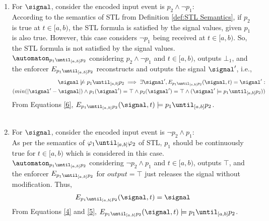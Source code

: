 \begin{enumerate}
\begin{enumerate}
                \item [Case b:] For $\signal$, consider the encoded input event is $p_2 \land \neg p_1$:\\
                
                According to the semantics of STL from Definition \ref{def:STL Semantics}, if  $p_2$ is true at  $t \in [a, b)$, the STL formula is satisfied by the signal values, given $p_1$ is also true. However, this case considers $\neg p_1$ being received at $t \in [a, b)$. So, the STL formula is not satisfied by the signal values.\\
                
                $\automaton_{p_1\until_{[a,b]}p_2}$ considering $p_2 \land \neg p_1$ and  $t \in [a,b) $, outputs $\bot_1$, and the enforcer $E_{p_1\until_{[a,b]}p_2}$ reconstructs and outputs the signal $\signal'$, i.e.,
            \begin{equation}    
            \begin{split}
            \label{6}
                \signal \not \models p_1\until_{[a,b]}p_2 \implies \exists\signal', E_{p_1\until_{[a,b]}p_2}(\signal, t)=\signal' : \\(min(|\signal'-\signal|) \land p_1(\signal')=\top \land p_2(\signal')=\top \land (\signal'\models p_1\until_{[a,b]}p_2))
            \end{split}
            \end{equation}  
            From Equations \ref{6},  $E_{p_1\until_{[a,b]}p_2}(\signal, t) \models p_1\until_{[a,b]}p_2$. \\~\\
            
                \item [Case c:] For $\signal$, consider the encoded input event is $\neg p_2 \land p_1$:\\
                    
                As per the semantics of $\varphi_1\until_{[a,b]}\varphi_2$ of STL, $p_1$ should be continuously true for $t \in [a,b) $ which is considered in this case.\\

                $\automaton_{p_1\until_{[a,b]}p_2}$ considering $\neg p_2 \land p_1$ and  $t \in [a,b) $, outputs $\top$, and the enforcer $E_{p_1\until_{[a,b]}p_2}$ for $output=\top$ just releases the signal without modification. Thus,
                \begin{align}
                \label{5}
                    E_{p_1\until_{[a,b]}p_2}(\signal, t)=\signal
                \end{align}
                From Equations \ref{4} and \ref{5},  $E_{p_1\until_{[a,b]}p_2}(\signal, t) \models p_1\until_{[a,b]}p_2$. \\~\\
        

\end{enumerate}
\end{enumerate}
